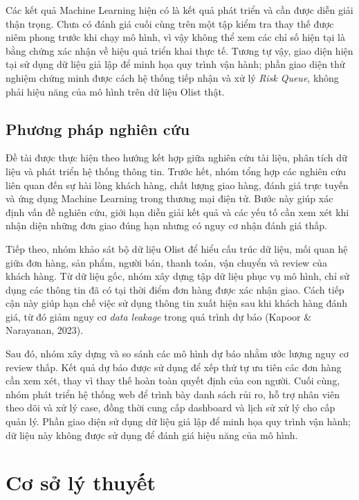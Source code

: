 \documentclass[12pt,a4paper]{report}
\begin{document}
Các kết quả Machine Learning hiện có là kết quả phát triển và cần được diễn giải thận trọng. Chưa có đánh giá cuối cùng trên một tập kiểm tra thay thế được niêm phong trước khi chạy mô hình, vì vậy không thể xem các chỉ số hiện tại là bằng chứng xác nhận về hiệu quả triển khai thực tế. Tương tự vậy, giao diện hiện tại sử dụng dữ liệu giả lập để minh họa quy trình vận hành; phần giao diện thử nghiệm chứng minh được cách hệ thống tiếp nhận và xử lý \emph{Risk Queue}, không phải hiệu năng của mô hình trên dữ liệu Olist thật.

\section{Phương pháp nghiên cứu}
\label{sec:phuong-phap-nghien-cuu}

Đề tài được thực hiện theo hướng kết hợp giữa nghiên cứu tài liệu, phân tích dữ liệu và phát triển hệ thống thông tin. Trước hết, nhóm tổng hợp các nghiên cứu liên quan đến sự hài lòng khách hàng, chất lượng giao hàng, đánh giá trực tuyến và ứng dụng Machine Learning trong thương mại điện tử. Bước này giúp xác định vấn đề nghiên cứu, giới hạn diễn giải kết quả và các yếu tố cần xem xét khi nhận diện những đơn giao đúng hạn nhưng có nguy cơ nhận đánh giá thấp.

Tiếp theo, nhóm khảo sát bộ dữ liệu Olist để hiểu cấu trúc dữ liệu, mối quan hệ giữa đơn hàng, sản phẩm, người bán, thanh toán, vận chuyển và review của khách hàng. Từ dữ liệu gốc, nhóm xây dựng tập dữ liệu phục vụ mô hình, chỉ sử dụng các thông tin đã có tại thời điểm đơn hàng được xác nhận giao. Cách tiếp cận này giúp hạn chế việc sử dụng thông tin xuất hiện sau khi khách hàng đánh giá, từ đó giảm nguy cơ \emph{data leakage} trong quá trình dự báo (Kapoor \& Narayanan, 2023).

Sau đó, nhóm xây dựng và so sánh các mô hình dự báo nhằm ước lượng nguy cơ review thấp. Kết quả dự báo được sử dụng để xếp thứ tự ưu tiên các đơn hàng cần xem xét, thay vì thay thế hoàn toàn quyết định của con người. Cuối cùng, nhóm phát triển hệ thống web để trình bày danh sách rủi ro, hỗ trợ nhân viên theo dõi và xử lý case, đồng thời cung cấp dashboard và lịch sử xử lý cho cấp quản lý. Phần giao diện sử dụng dữ liệu giả lập để minh họa quy trình vận hành; dữ liệu này không được sử dụng để đánh giá hiệu năng của mô hình.

\chapter{Cơ sở lý thuyết}\label{ch:theory}
\end{document}
